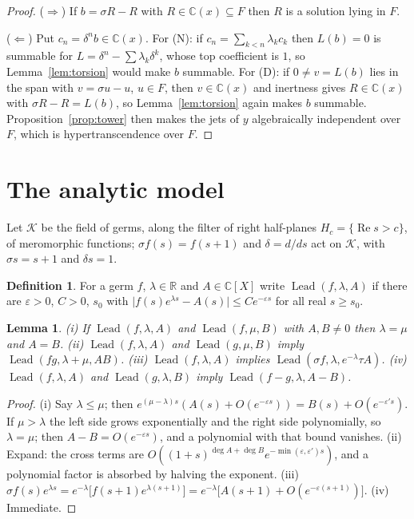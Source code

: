 \documentclass[11pt,a4paper]{amsart}
\theoremstyle{plain}
\newtheorem{lemma}[theorem]{Lemma}
\theoremstyle{definition}
\newtheorem{definition}[theorem]{Definition}
\newcommand{\CC}{\mathbb{C}}
\newcommand{\RR}{\mathbb{R}}
\newcommand{\sig}{\sigma}
\newcommand{\dd}{\delta}
\begin{document}
\begin{proof}
($\Rightarrow$) If $b=\sig R-R$ with $R\in\CC(x)\subseteq F$ then $R$ is a solution lying in $F$.

($\Leftarrow$) Put $c_n=\dd^nb\in\CC(x)$. For (N): if $c_n=\sum_{k<n}\lambda_kc_k$ then $L(b)=0$ is
summable for $L=\dd^n-\sum\lambda_k\dd^k$, whose top coefficient is $1$, so Lemma~\ref{lem:torsion}
would make $b$ summable. For (D): if $0\neq v=L(b)$ lies in the span with $v=\sig u-u$, $u\in F$, then
$v\in\CC(x)$ and inertness gives $R\in\CC(x)$ with $\sig R-R=L(b)$, so Lemma~\ref{lem:torsion} again
makes $b$ summable. Proposition~\ref{prop:tower} then makes the jets of $y$ algebraically independent
over $F$, which is hypertranscendence over $F$.
\end{proof}

\section{The analytic model}\label{sec:model}

Let $\mathcal K$ be the field of germs, along the filter of right half-planes
$H_c=\{\operatorname{Re}s>c\}$, of meromorphic functions; $\sig f(s)=f(s+1)$ and $\dd=d/ds$ act on
$\mathcal K$, with $\sig s=s+1$ and $\dd s=1$.

\begin{definition}\label{def:lead}
For a germ $f$, $\lambda\in\RR$ and $A\in\CC[X]$ write $\operatorname{Lead}(f,\lambda,A)$ if there
are $\varepsilon>0$, $C>0$, $s_0$ with
$\bigl|f(s)e^{\lambda s}-A(s)\bigr|\le Ce^{-\varepsilon s}$ for all real $s\ge s_0$.
\end{definition}

\begin{lemma}\label{lem:leadprops}
\textup{(i)} If $\operatorname{Lead}(f,\lambda,A)$ and $\operatorname{Lead}(f,\mu,B)$ with $A,B\neq0$
then $\lambda=\mu$ and $A=B$.
\textup{(ii)} $\operatorname{Lead}(f,\lambda,A)$ and $\operatorname{Lead}(g,\mu,B)$ imply
$\operatorname{Lead}(fg,\lambda+\mu,AB)$.
\textup{(iii)} $\operatorname{Lead}(f,\lambda,A)$ implies
$\operatorname{Lead}(\sig f,\lambda,e^{-\lambda}\tau A)$.
\textup{(iv)} $\operatorname{Lead}(f,\lambda,A)$ and $\operatorname{Lead}(g,\lambda,B)$ imply
$\operatorname{Lead}(f-g,\lambda,A-B)$.
\end{lemma}

\begin{proof}
(i) Say $\lambda\le\mu$; then $e^{(\mu-\lambda)s}(A(s)+O(e^{-\varepsilon s}))=B(s)+O(e^{-\varepsilon's})$.
If $\mu>\lambda$ the left side grows exponentially and the right side polynomially, so $\lambda=\mu$;
then $A-B=O(e^{-\varepsilon s})$, and a polynomial with that bound vanishes.
(ii) Expand: the cross terms are $O((1+s)^{\deg A+\deg B}e^{-\min(\varepsilon,\varepsilon')s})$, and a
polynomial factor is absorbed by halving the exponent.
(iii) $\sig f(s)e^{\lambda s}=e^{-\lambda}\bigl[f(s+1)e^{\lambda(s+1)}\bigr]
=e^{-\lambda}\bigl[A(s+1)+O(e^{-\varepsilon(s+1)})\bigr]$.
(iv) Immediate.
\end{proof}
\end{document}
